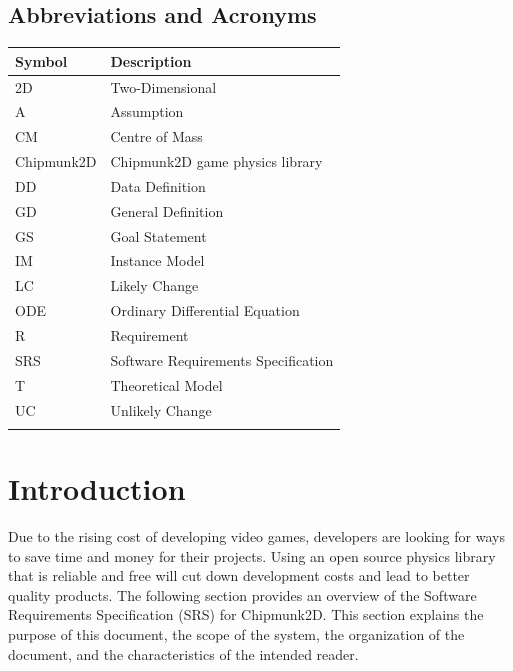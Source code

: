 \documentclass[12pt]{article}
\begin{document}
\subsection{Abbreviations and Acronyms}
\label{Sec:TAbbAcc}
\begin{longtable*}{l l}
\toprule
Symbol & Description
\\
\midrule
2D & Two-Dimensional
\\
A & Assumption
\\
CM & Centre of Mass
\\
Chipmunk2D & Chipmunk2D game physics library
\\
DD & Data Definition
\\
GD & General Definition
\\
GS & Goal Statement
\\
IM & Instance Model
\\
LC & Likely Change
\\
ODE & Ordinary Differential Equation
\\
R & Requirement
\\
SRS & Software Requirements Specification
\\
T & Theoretical Model
\\
UC & Unlikely Change
\\
\bottomrule
\label{Table:TAbbAcc}
\end{longtable*}
\section{Introduction}
\label{Sec:Intro}
Due to the rising cost of developing video games, developers are looking for ways to save time and money for their projects. Using an open source physics library that is reliable and free will cut down development costs and lead to better quality products.
The following section provides an overview of the Software Requirements Specification (SRS) for Chipmunk2D. This section explains the purpose of this document, the scope of the system, the organization of the document, and the characteristics of the intended reader.
\end{document}
